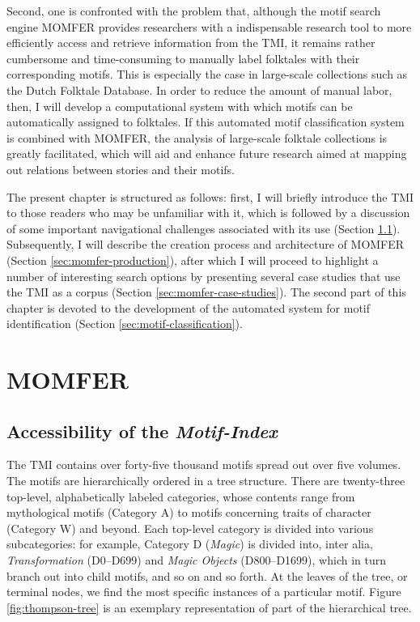 Second, one is confronted with the problem that, although the motif search engine MOMFER provides researchers with a indispensable research tool to more efficiently access and retrieve information from the TMI, it remains rather cumbersome and time-consuming to manually label folktales with their corresponding motifs. This is especially the case in large-scale collections such as the Dutch Folktale Database.\autocite{meder:2010,meder:2016} In order to reduce the amount of manual labor, then, I will develop a computational system with which motifs can be automatically assigned to folktales. If this automated motif classification system is combined with MOMFER, the analysis of large-scale folktale collections is greatly facilitated, which will aid and enhance future research aimed at mapping out relations between stories and their motifs.

The present chapter is structured as follows: first, I will briefly introduce the TMI to those readers who may be unfamiliar with it, which is followed by a discussion of some important navigational challenges associated with its use (Section \ref{sec:momfer-accessibility}). Subsequently, I will describe the creation process and architecture of MOMFER (Section \ref{sec:momfer-production}), after which I will proceed to highlight a number of interesting search options by presenting several case studies that use the TMI as a corpus (Section \ref{sec:momfer-case-studies}). The second part of this chapter is devoted to the development of the automated system for motif identification (Section \ref{sec:motif-classification}). 

\section{MOMFER}

\subsection{Accessibility of the \emph{Motif-Index}}\label{sec:momfer-accessibility}

The TMI\autocite{thompson:1955} contains over forty-five thousand motifs spread out over five volumes. The motifs are hierarchically ordered in a tree structure. There are twenty-three top-level, alphabetically labeled categories, whose contents range from mythological motifs (Category A) to motifs concerning traits of character (Category W) and beyond. Each top-level category is divided into various subcategories: for example, Category D (\emph{Magic}) is divided into, inter alia, \emph{Transformation} (D0--D699) and \emph{Magic Objects} (D800--D1699), which in turn branch out into child motifs, and so on and so forth. At the leaves of the tree, or terminal nodes, we find the most specific instances of a particular motif\autocites[For an elaboration on the build-up of the index and search strategies, see][Volume 1, 19–25]{thompson:1955}[16--17]{el-shamy:1995}. Figure \ref{fig:thompson-tree} is an exemplary representation of part of the hierarchical tree.

